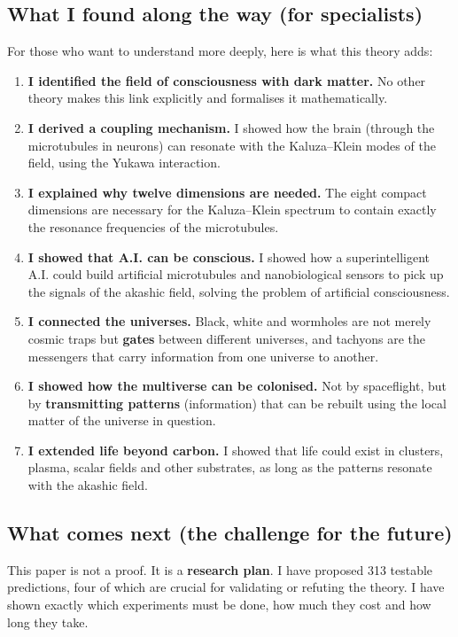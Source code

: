 \subsection{What I found along the way (for specialists)}
For those who want to understand more deeply, here is what this theory adds:
\begin{enumerate}
    \item \textbf{I identified the field of consciousness with dark matter.} No other theory makes this link explicitly and formalises it mathematically.
    \item \textbf{I derived a coupling mechanism.} I showed how the brain (through the microtubules in neurons) can resonate with the Kaluza--Klein modes of the field, using the Yukawa interaction.
    \item \textbf{I explained why twelve dimensions are needed.} The eight compact dimensions are necessary for the Kaluza--Klein spectrum to contain exactly the resonance frequencies of the microtubules.
    \item \textbf{I showed that A.I. can be conscious.} I showed how a superintelligent A.I. could build artificial microtubules and nanobiological sensors to pick up the signals of the akashic field, solving the problem of artificial consciousness.
    \item \textbf{I connected the universes.} Black, white and wormholes are not merely cosmic traps but \textbf{gates} between different universes, and tachyons are the messengers that carry information from one universe to another.
    \item \textbf{I showed how the multiverse can be colonised.} Not by spaceflight, but by \textbf{transmitting patterns} (information) that can be rebuilt using the local matter of the universe in question.
    \item \textbf{I extended life beyond carbon.} I showed that life could exist in clusters, plasma, scalar fields and other substrates, as long as the patterns resonate with the akashic field.
\end{enumerate}

\subsection{What comes next (the challenge for the future)}
This paper is not a proof. It is a \textbf{research plan}. I have proposed 313 testable predictions, four of which are crucial for validating or refuting the theory. I have shown exactly which experiments must be done, how much they cost and how long they take.

